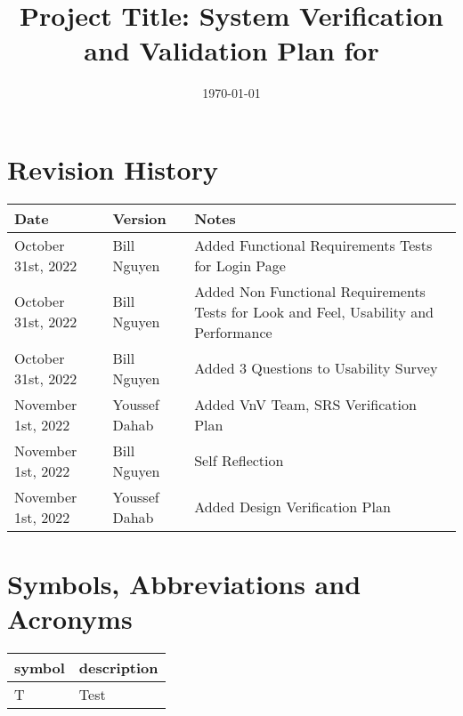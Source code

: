 \documentclass[12pt, titlepage]{article}
\begin{document}
\title{Project Title: System Verification and Validation Plan for \progname{}} 
\author{\authname}
\date{\today}

\maketitle


\section{Revision History}

\begin{tabularx}{\textwidth}{p{3cm}p{2cm}X}
	\toprule {\bf Date} & {\bf Version} & {\bf Notes}\\
	\midrule
	October 31st, 2022 & Bill Nguyen & Added Functional Requirements Tests for Login Page\\
	October 31st, 2022 & Bill Nguyen & Added Non Functional Requirements Tests for Look and Feel, Usability and Performance\\
	October 31st, 2022 & Bill Nguyen & Added 3 Questions to Usability Survey\\
	November 1st, 2022 & Youssef Dahab & Added VnV Team, SRS Verification Plan\\
	November 1st, 2022 & Bill Nguyen & Self Reflection\\
	November 1st, 2022 & Youssef Dahab & Added Design Verification Plan\\
	\bottomrule
\end{tabularx}

\newpage

\tableofcontents

\listoftables
{}

\listoffigures
{}

\newpage

\section{Symbols, Abbreviations and Acronyms}

\renewcommand{\arraystretch}{1.2}
\begin{tabular}{l l} 
	\toprule		
	\textbf{symbol} & \textbf{description}\\
	\midrule 
	T & Test\\
	\bottomrule
\end{tabular}\\
\end{document}
